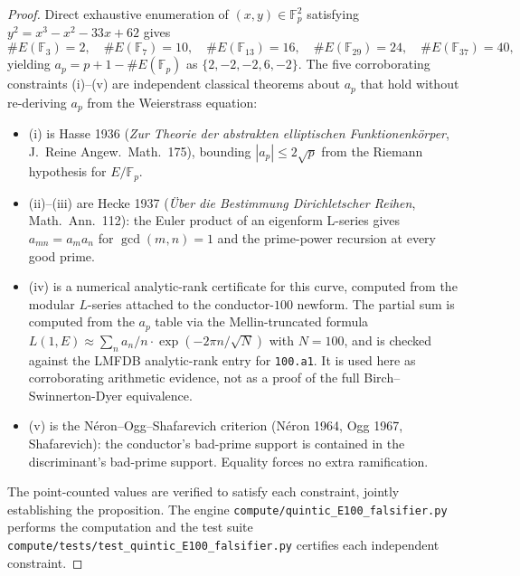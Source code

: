 \documentclass{article}
\begin{document}
\begin{proof}
Direct exhaustive enumeration of $(x, y) \in \mathbb{F}_p^2$ satisfying
$y^2 = x^3 - x^2 - 33 x + 62$ gives
\[
  \#E(\mathbb{F}_3) = 2,\quad \#E(\mathbb{F}_7) = 10,\quad
  \#E(\mathbb{F}_{13}) = 16,\quad \#E(\mathbb{F}_{29}) = 24,\quad
  \#E(\mathbb{F}_{37}) = 40,
\]
yielding $a_p = p + 1 - \#E(\mathbb{F}_p)$ as $\{2, -2, -2, 6, -2\}$.
The five corroborating constraints (i)--(v) are independent classical
theorems about $a_p$ that hold without re-deriving $a_p$ from the
Weierstrass equation:
\begin{itemize}[leftmargin=2em]
\item (i) is Hasse 1936 (\emph{Zur Theorie der abstrakten elliptischen
      Funktionenkörper}, J.~Reine Angew.~Math.~175), bounding
      $|a_p| \leq 2\sqrt{p}$ from the Riemann hypothesis for $E/\mathbb{F}_p$.
\item (ii)--(iii) are Hecke 1937 (\emph{Über die Bestimmung
      Dirichletscher Reihen}, Math.~Ann.~112): the Euler product of an
      eigenform L-series gives $a_{mn} = a_m a_n$ for $\gcd(m, n) = 1$
      and the prime-power recursion at every good prime.
\item (iv) is a numerical analytic-rank certificate for this curve,
      computed from the modular $L$-series attached to the conductor-$100$
      newform. The partial sum is computed from the $a_p$ table via the
      Mellin-truncated formula
      $L(1, E) \approx \sum_n a_n / n \cdot \exp(-2\pi n / \sqrt{N})$
      with $N = 100$, and is checked against the LMFDB analytic-rank
      entry for \texttt{100.a1}. It is used here as corroborating
      arithmetic evidence, not as a proof of the full Birch--Swinnerton-Dyer
      equivalence.
\item (v) is the N\'{e}ron--Ogg--Shafarevich criterion (N\'{e}ron 1964,
      Ogg 1967, Shafarevich): the conductor's bad-prime support is
      contained in the discriminant's bad-prime support. Equality forces
      no extra ramification.
\end{itemize}
The point-counted values are verified to satisfy each constraint,
jointly establishing the proposition. The engine
\texttt{compute/quintic\_E100\_falsifier.py} performs the computation
and the test suite
\texttt{compute/tests/test\_quintic\_E100\_falsifier.py} certifies
each independent constraint.
\end{proof}
\end{document}
